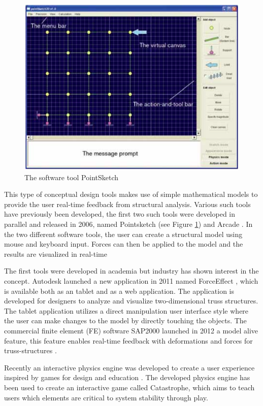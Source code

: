 \begin{figure}
  \includegraphics[width=350pt]{graphics/pointsketch.png}
  \caption{The software tool PointSketch}
  \label{fig:pointsketch}
\end{figure}

This type of conceptual design tools makes use of simple mathematical models to provide the user real-time feedback from structural analysis. Various such tools have previously been developed, the first two such tools were developed in parallel and released in 2006, named Pointsketch \cite{Olsson2006} (see Figure \ref{fig:pointsketch}) and Arcade \cite{martini2008new}. In the two different software tools, the user can create a structural model using mouse and keyboard input. Forces can then be applied to the model and the results are visualized in real-time 

The first tools were developed in academia but industry has shown interest in the concept. Autodesk launched a new application in 2011 named ForceEffect \cite{Autodesk2011}, which is available both as an tablet and as a web application. The application is developed for designers to analyze and visualize two-dimensional truss structures. The tablet application utilizes a direct manipulation user interface style where the user can make changes to the model by directly touching the objects. The commercial finite element (FE) software SAP2000 \cite{sap2000} launched in 2012 a model alive feature, this feature enables real-time feedback with deformations and forces for truss-structures \cite{clune2012object}.

Recently an interactive physics engine was developed to create a user experience inspired by games for design and education \cite{Senatore2015}. The developed physics engine has been used to create an interactive game called Catastrophe, which aims to teach users which elements are critical to system stability through play.

